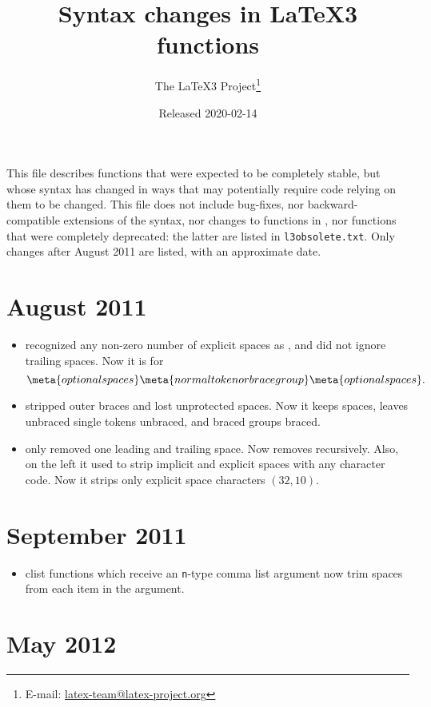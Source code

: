 \documentclass{l3doc}
\title{%
  Syntax changes in \LaTeX3 functions%
}
\author{%
  The \LaTeX3 Project\thanks
    {%
      E-mail:
      \href{mailto:latex-team@latex-project.org}%
        {latex-team@latex-project.org}%
    }%
}
\date{Released 2020-02-14}
\newcommand{\TF}{\textit{(TF)}}
\begin{document}
\maketitle

This file describes functions that were expected to be completely
stable, but whose syntax has changed in ways that may potentially
require code relying on them to be changed.  This file does not include
bug-fixes, nor backward-compatible extensions of the syntax, nor changes
to functions in , nor functions that were completely
deprecated: the latter are listed in \texttt{l3obsolete.txt}.  Only
changes after August 2011 are listed, with an approximate date.

\section{August 2011}

\begin{itemize}
  \item \cs{tl_if_single:n\TF} recognized any non-zero number of
    explicit spaces as , and did not ignore trailing spaces.
    Now it is  for
    \[
      \meta{optional spaces}
      \meta{normal token or brace group}
      \meta{optional spaces}.
    \]
  \item {} stripped outer braces and lost unprotected spaces.
    Now it keeps spaces, leaves unbraced single tokens unbraced, and
    braced groups braced.
  \item {} only removed one leading and trailing space.
    Now removes recursively. Also, on the left it used to strip implicit
    and explicit spaces with any character code. Now it strips only explicit
    space characters $(32,10)$.
\end{itemize}

\section{September 2011}

\begin{itemize}
\item clist functions which receive an \texttt{n}-type comma list argument
  now trim spaces from each item in the argument.
\end{itemize}

\section{May 2012}
\end{document}
